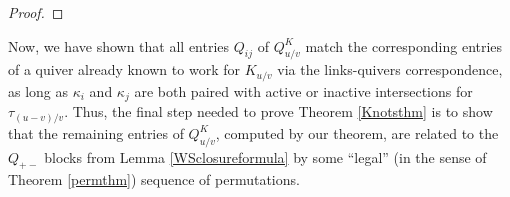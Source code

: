 \documentclass[11pt]{amsart}
\theoremstyle{plain}
\theoremstyle{definition}
\theoremstyle{remark}
\begin{document}
\begin{proof}

\end{proof}

Now, we have shown that all entries $Q_{ij}$ of $Q_{u/v}^K$ match the corresponding entries of a quiver already known to work for $K_{u/v}$ via the links-quivers correspondence, as long as $\kappa_i$ and $\kappa_j$ are both paired with active or inactive intersections for $\tau_{(u-v)/v}$. Thus, the final step needed to prove Theorem \ref{Knotsthm} is to show that the remaining entries of $Q_{u/v}^K$, computed by our theorem, are related to the $Q_{+-}$ blocks from Lemma \ref{WSclosureformula} by some ``legal'' (in the sense of Theorem \ref{permthm}) sequence of permutations. 
\end{document}

